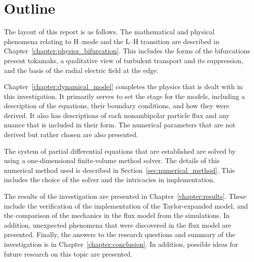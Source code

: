 \section{Outline}\label{sec:outline}
The layout of this report is as follows.
The mathematical and physical phenomena relating to H--mode and the L--H transition are described in Chapter~\ref{chapter:physics_bifurcation}.
This includes the forms of the bifurcations present tokamaks, a qualitative view of turbulent transport and its suppression, and the basis of the radial electric field at the edge.

Chapter~\ref{chapter:dynamical_model} completes the physics that is dealt with in this investigation.
It primarily serves to set the stage for the models, including a description of the equations, their boundary conditions, and how they were derived.
It also has descriptions of each nonambipolar particle flux and any nuance that is included in their form.
The numerical parameters that are not derived but rather chosen are also presented.

The system of partial differential equations that are established are solved by using a one-dimensional finite-volume method solver.
The details of this numerical method used is described in Section~\ref{sec:numerical_method}.
This includes the choice of the solver and the intricacies in implementation.

The results of the investigation are presented in Chapter~\ref{chapter:results}.
These include the verification of the implementation of the Taylor-expanded model, and the comparison of the mechanics in the flux model from the simulations.
In addition, unexpected phenomena that were discovered in the flux model are presented.
Finally, the answers to the research questions and summary of the investigation is in Chapter~\ref{chapter:conclusion}.
In addition, possible ideas for future research on this topic are presented.

